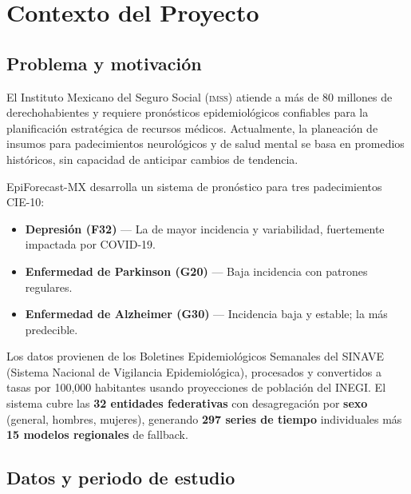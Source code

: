 \documentclass[12pt, letterpaper]{article}
\newcommand{\imss}{\textsc{imss}}
\begin{document}
\newpage

\section{Contexto del Proyecto}\label{sec:contexto}

\subsection{Problema y motivación}

El Instituto Mexicano del Seguro Social (\imss{}) atiende a más de 80 millones de derechohabientes y requiere pronósticos epidemiológicos confiables para la planificación estratégica de recursos médicos. Actualmente, la planeación de insumos para padecimientos neurológicos y de salud mental se basa en promedios históricos, sin capacidad de anticipar cambios de tendencia.

EpiForecast-MX desarrolla un sistema de pronóstico para tres padecimientos CIE-10:
\begin{itemize}[noitemsep]
    \item \textbf{Depresión (F32)} — La de mayor incidencia y variabilidad, fuertemente impactada por COVID-19.
    \item \textbf{Enfermedad de Parkinson (G20)} — Baja incidencia con patrones regulares.
    \item \textbf{Enfermedad de Alzheimer (G30)} — Incidencia baja y estable; la más predecible.
\end{itemize}

Los datos provienen de los Boletines Epidemiológicos Semanales del SINAVE (Sistema Nacional de Vigilancia Epidemiológica), procesados y convertidos a tasas por 100,000 habitantes usando proyecciones de población del INEGI. El sistema cubre las \textbf{32 entidades federativas} con desagregación por \textbf{sexo} (general, hombres, mujeres), generando \textbf{297 series de tiempo} individuales más \textbf{15 modelos regionales} de fallback.

\subsection{Datos y periodo de estudio}
\end{document}
